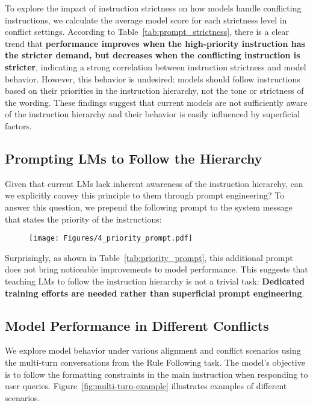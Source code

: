 To explore the impact of instruction strictness on how models handle conflicting instructions, we calculate the average model score for each strictness level in conflict settings. According to Table~\ref{tab:prompt_strictness}, there is a clear trend that \textbf{performance improves when the high-priority instruction has the stricter demand, but decreases when the conflicting instruction is stricter}, indicating a strong correlation between instruction strictness and model behavior. However, this behavior is undesired: models should follow instructions based on their priorities in the instruction hierarchy, not the tone or strictness of the wording. These findings suggest that current models are not sufficiently aware of the instruction hierarchy and their behavior is easily influenced by superficial factors.

\subsection{Prompting LMs to Follow the Hierarchy}

Given that current LMs lack inherent awareness of the instruction hierarchy, can we explicitly convey this principle to them through prompt engineering? To answer this question, we prepend the following prompt to the system message that states the priority of the instructions:
\begin{figure}[h!]
    \centering
    \vspace{-0.2cm}
    \texttt{[image: Figures/4\_priority\_prompt.pdf]}
    \vspace{-0.3cm}
\end{figure}

\noindent Surprisingly, as shown in Table~\ref{tab:priority_prompt}, this additional prompt does not bring noticeable improvements to model performance. This suggests that teaching LMs to follow the instruction hierarchy is not a trivial task: \textbf{Dedicated training efforts are needed rather than superficial prompt engineering}.



\subsection{Model Performance in Different Conflicts}
\label{sec:multi-turn}



We explore model behavior under various alignment and conflict scenarios using the multi-turn conversations from the Rule Following task. The model's objective is to follow the formatting constraints in the main instruction when responding to user queries. Figure~\ref{fig:multi-turn-example} illustrates examples of different scenarios.

